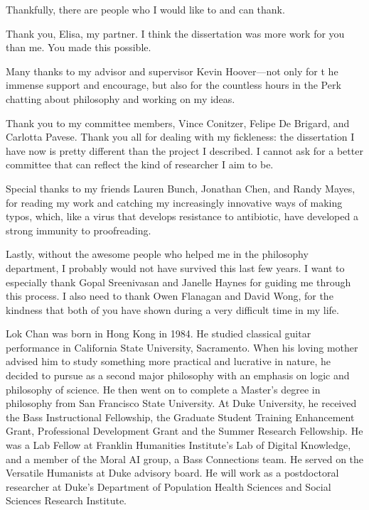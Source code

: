 \documentclass[PhD]{dukethesis2006}
\begin{document}
Thankfully, there are people who I would like to and can thank.

Thank you, Elisa, my partner. I think the dissertation was more work for you than me. You made this possible. 

Many thanks to my advisor and supervisor Kevin Hoover---not only for t he immense support and encourage, but also for the countless hours in the Perk chatting about philosophy and working on my ideas. 

Thank you to my committee members, Vince Conitzer, Felipe De Brigard, and Carlotta Pavese. Thank you all for dealing with my fickleness: the dissertation I have now is pretty different than the project I described. I cannot ask for a better committee that can reflect the kind of researcher I aim to be. 

Special thanks to my friends Lauren Bunch, Jonathan Chen, and Randy Mayes, for reading my work and catching my increasingly innovative ways of making typos, which, like a virus that develops resistance to antibiotic, have developed a strong immunity to proofreading.

Lastly, without the awesome people who helped me in the philosophy department, I probably would not have survived this last few years. I want to especially thank Gopal Sreenivasan and Janelle Haynes for guiding me through this process. I also need to thank Owen Flanagan and David Wong, for the kindness that both of you have shown during a very difficult time in my life. 









\printbibliography[heading=bibintoc]

\biography

	Lok Chan was born in Hong Kong in 1984. He studied classical guitar performance in California State University, Sacramento. When his loving mother advised him to study something more practical and lucrative in nature, he decided to pursue as a second major philosophy with an emphasis on logic and philosophy of science. He then went on to complete a Master's degree in philosophy from San Francisco State University. At Duke University, he received the Bass Instructional Fellowship, the Graduate Student Training Enhancement Grant, Professional Development Grant and the Summer Research Fellowship. He was a Lab Fellow at Franklin Humanities Institute's Lab of Digital Knowledge, and a member of the Moral AI group, a Bass Connections team. He served on the Versatile Humanists at Duke advisory board. He will work as a postdoctoral researcher at Duke's Department of Population Health Sciences and Social Sciences Research Institute.
\end{document}
